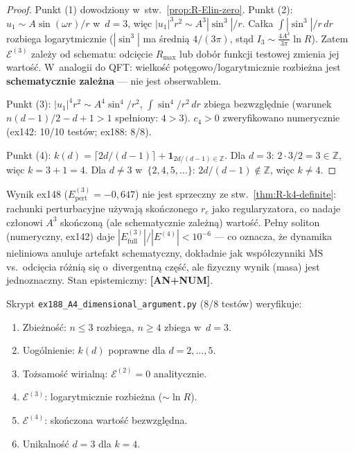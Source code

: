 \begin{proof}
Punkt (1) dowodziony w~stw.~\ref{prop:R-Elin-zero}.
Punkt (2): $u_1 \sim A\sin(\omega r)/r$ w~$d=3$, wi\k{e}c
$|u_1|^3 r^2 \sim A^3|\sin^3|/r$.
Ca\l{}ka $\int |\sin^3|/r\,dr$ rozbiega logarytmicznie
($|\sin^3|$ ma \'sredni\k{a} $4/(3\pi)$, st\k{a}d
$I_3 \sim \frac{4A^3}{3\pi}\ln R$).
Zatem $\mathcal{E}^{(3)}$ zale\.zy od schematu:
odci\k{e}cie $R_{\max}$ lub dob\'or funkcji testowej
zmienia jej warto\'s\'c. W~analogii do QFT:
wielko\'s\'c pot\k{e}gowo/logarytmicznie rozbie\.zna
jest \textbf{schematycznie zale\.zna}
--- nie jest obserwablem.

Punkt (3): $|u_1|^4 r^2 \sim A^4 \sin^4/r^2$,
$\int \sin^4/r^2\,dr$ zbiega bezwzgl\k{e}dnie
(warunek $n(d-1)/2 - d + 1 > 1$ spe\l{}niony: $4 > 3$).
$c_4 > 0$ zweryfikowano numerycznie
(ex142: 10/10 test\'ow; ex188: 8/8).

Punkt (4): $k(d) = \lceil 2d/(d-1) \rceil + \mathbf{1}_{2d/(d-1)\in\mathbb{Z}}$.
Dla $d = 3$: $2\cdot3/2 = 3 \in \mathbb{Z}$, wi\k{e}c $k = 3 + 1 = 4$.
Dla $d \neq 3$ w~$\{2,4,5,\ldots\}$: $2d/(d-1) \notin \mathbb{Z}$,
wi\k{e}c $k \neq 4$.
\end{proof}

\begin{remark}%
\label{rem:R-E3-reconciliation}
Wynik ex148 ($E^{(3)}_{\mathrm{pert}} = -0{,}647$) nie jest sprzeczny
ze stw.~\ref{thm:R-k4-definite}: rachunki perturbacyjne u\.zywaj\k{a}
sko\'nczonego $r_c$ jako regularyzatora, co nadaje cz\l{}onowi $A^3$
sko\'nczon\k{a} (ale schematycznie zale\.zn\k{a}) warto\'s\'c.
Pe\l{}ny soliton (numeryczny, ex142) daje
$|E^{(3)}_{\mathrm{full}}|/|E^{(4)}| < 10^{-6}$ ---
co oznacza, \.ze dynamika nieliniowa anuluje artefakt schematyczny,
dok\l{}adnie jak wsp\'o\l{}czynniki $\overline{\mathrm{MS}}$
vs.\ odci\k{e}cia r\'o\.zni\k{a} si\k{e} o~divergentn\k{a} cz\k{e}\'s\'c,
ale fizyczny wynik (masa) jest jednoznaczny.
Stan epistemiczny: \textbf{[AN+NUM]}.
\end{remark}

\begin{remark}%
\label{rem:R-ex188}
Skrypt \texttt{ex188\_A4\_dimensional\_argument.py} (8/8 test\'ow)
weryfikuje:
\begin{enumerate}[nosep]
  \item Zbie\.zno\'s\'c: $n \leq 3$ rozbiega, $n \geq 4$ zbiega w~$d = 3$.
  \item Uog\'olnienie: $k(d)$ poprawne dla $d = 2, \ldots, 5$.
  \item To\.zsamo\'s\'c wirialn\k{a}: $\mathcal{E}^{(2)} = 0$ analitycznie.
  \item $\mathcal{E}^{(3)}$: logarytmicznie rozbie\.zna
    ($\sim \ln R$).
  \item $\mathcal{E}^{(4)}$: sko\'nczona warto\'s\'c bezwzgl\k{e}dna.
  \item Unikalno\'s\'c $d = 3$ dla $k = 4$.
\end{enumerate}
\end{remark}
